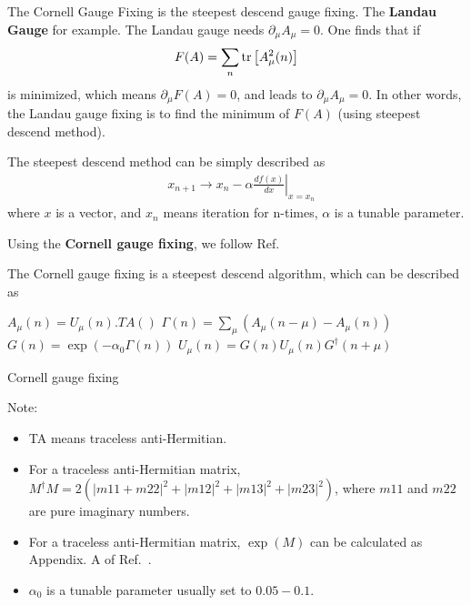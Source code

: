The Cornell Gauge Fixing is the steepest descend gauge fixing. The \textbf{Landau Gauge} for example. The Landau gauge needs $\partial _{\mu}A_{\mu}=0$. One finds that if
\begin{equation}
\begin{split}
&F(A)=\sum _n{\rm tr}\left[A_{\mu}^2(n)\right]\\
\end{split}
\end{equation}
is minimized, which means $\partial _{\mu}F(A)=0$, and leads to $\partial _{\mu}A_{\mu}=0$. In other words, the Landau gauge fixing is to find the minimum of $F(A)$ (using steepest descend method).

The steepest descend method can be simply described as
\begin{equation}
\begin{split}
&x_{n+1}\to x_n - \alpha \left.\frac{d f(x)}{dx}\right|_{x=x_n}
\end{split}
\end{equation}
where $x$ is a vector, and $x_n$ means iteration for n-times, $\alpha$ is a tunable parameter.

Using the \textbf{Cornell gauge fixing}, we follow Ref.~\cite{CornellGaugeFixing}

The Cornell gauge fixing is a steepest descend algorithm, which can be described as
\begin{algorithm}[H]
\begin{algorithmic}
    \State $A_{\mu}(n)=U_{\mu}(n).TA()$
    \State $\Gamma (n)=\sum _{\mu}(A_{\mu}(n-\mu)-A_{\mu}(n))$
        \Return 
    \EndIf
    \State $G(n)=\exp \left(-\alpha _0\Gamma (n)\right)$
    \State $U_{\mu}(n)=G(n)U_{\mu}(n)G^{\dagger}(n+\mu)$
\EndFor
\end{algorithmic}
\caption{\label{alg.CornellGaugeFixing}Cornell gauge fixing}
\end{algorithm}

Note:
\begin{itemize}
  \item TA means traceless anti-Hermitian.
  \item For a traceless anti-Hermitian matrix, $M^{\dagger}M=2(|m11+m22|^2+|m12|^2+|m13|^2+|m23|^2)$, where $m11$ and $m22$ are pure imaginary numbers.
  \item For a traceless anti-Hermitian matrix, $\exp (M)$ can be calculated as Appendix. A of Ref.~\cite{luscher2005}.
  \item $\alpha _0$ is a tunable parameter usually set to $0.05 - 0.1$.
\end{itemize}

